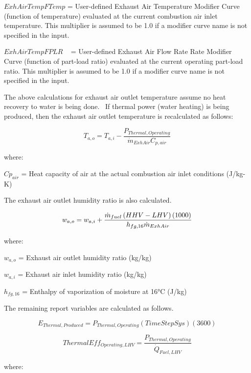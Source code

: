 \(ExhAirTempFTemp\) = User-defined Exhaust Air Temperature Modifier Curve (function of temperature) evaluated at the current combustion air inlet temperature. This multiplier is assumed to be 1.0 if a modifier curve name is not specified in the input.

\(ExhAirTempFPLR\) ~ = User-defined Exhaust Air Flow Rate Rate Modifier Curve (function of part-load ratio) evaluated at the current operating part-load ratio. This multiplier is assumed to be 1.0 if a modifier curve name is not specified in the input.

The above calculations for exhaust air outlet temperature assume no heat recovery to water is being done.~ If thermal power (water heating) is being produced, then the exhaust air outlet temperature is recalculated as follows:

\begin{equation}
T_{a,o} = T_{a,i} - \frac{P_{Thermal,Operating}}{\dot{m}_{ExhAir}C_{p,air}}
\end{equation}

where:

\(C{p_{air}}\) = Heat capacity of air at the actual combustion air inlet conditions (J/kg-K)

The exhaust air outlet humidity ratio is also calculated.

\begin{equation}
  w_{a,o} = w_{a,i} + \frac{\dot{m}_{fuel} \left(HHV - LHV\right) \left(1000\right)}{h_{fg,16} \dot{m}_{ExhAir}}
\end{equation}

where:

\({w_{a,o}}\) = Exhaust air outlet humidity ratio (kg/kg)

\({w_{a,i}}\) = Exhaust air inlet humidity ratio (kg/kg)

\({h_{fg,16}}\) = Enthalpy of vaporization of moisture at 16°C (J/kg)

The remaining report variables are calculated as follows.

\begin{equation}
{E_{Thermal,Produced}} = {P_{Thermal,Operating}}\left( {TimeStepSys} \right)\left( {3600} \right)
\end{equation}

\begin{equation}
ThermalEff_{Operating,LHV} = \frac{P_{Thermal,Operating}}{\dot{Q}_{Fuel,LHV}}
\end{equation}

where:

